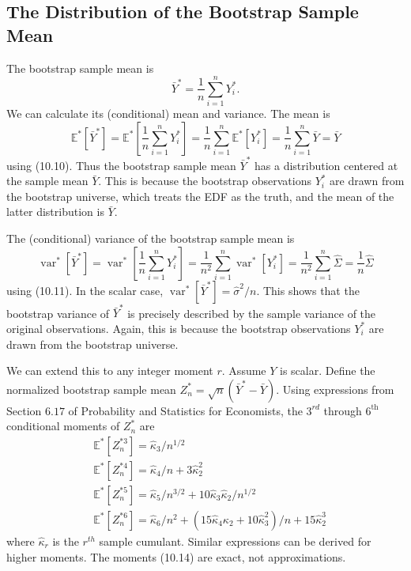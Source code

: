 \documentclass[10pt]{article}
\begin{document}
\subsection{The Distribution of the Bootstrap Sample Mean}
The bootstrap sample mean is
$$
\bar{Y}^{*}=\frac{1}{n} \sum_{i=1}^{n} Y_{i}^{*} .
$$
We can calculate its (conditional) mean and variance. The mean is
$$
\mathbb{E}^{*}\left[\bar{Y}^{*}\right]=\mathbb{E}^{*}\left[\frac{1}{n} \sum_{i=1}^{n} Y_{i}^{*}\right]=\frac{1}{n} \sum_{i=1}^{n} \mathbb{E}^{*}\left[Y_{i}^{*}\right]=\frac{1}{n} \sum_{i=1}^{n} \bar{Y}=\bar{Y}
$$
using (10.10). Thus the bootstrap sample mean $\bar{Y}^{*}$ has a distribution centered at the sample mean $\bar{Y}$. This is because the bootstrap observations $Y_{i}^{*}$ are drawn from the bootstrap universe, which treats the EDF as the truth, and the mean of the latter distribution is $\bar{Y}$.

The (conditional) variance of the bootstrap sample mean is
$$
\operatorname{var}^{*}\left[\bar{Y}^{*}\right]=\operatorname{var}^{*}\left[\frac{1}{n} \sum_{i=1}^{n} Y_{i}^{*}\right]=\frac{1}{n^{2}} \sum_{i=1}^{n} \operatorname{var}^{*}\left[Y_{i}^{*}\right]=\frac{1}{n^{2}} \sum_{i=1}^{n} \widehat{\Sigma}=\frac{1}{n} \widehat{\Sigma}
$$
using (10.11). In the scalar case, $\operatorname{var}^{*}\left[\bar{Y}^{*}\right]=\widehat{\sigma}^{2} / n$. This shows that the bootstrap variance of $\bar{Y}^{*}$ is precisely described by the sample variance of the original observations. Again, this is because the bootstrap observations $Y_{i}^{*}$ are drawn from the bootstrap universe.

We can extend this to any integer moment $r$. Assume $Y$ is scalar. Define the normalized bootstrap sample mean $Z_{n}^{*}=\sqrt{n}\left(\bar{Y}^{*}-\bar{Y}\right)$. Using expressions from Section $6.17$ of Probability and Statistics for Economists, the $3^{r d}$ through $6^{\text {th }}$ conditional moments of $Z_{n}^{*}$ are
$$
\begin{aligned}
&\mathbb{E}^{*}\left[Z_{n}^{* 3}\right]=\widehat{\kappa}_{3} / n^{1 / 2} \\
&\mathbb{E}^{*}\left[Z_{n}^{* 4}\right]=\widehat{\kappa}_{4} / n+3 \widehat{\kappa}_{2}^{2} \\
&\mathbb{E}^{*}\left[Z_{n}^{* 5}\right]=\widehat{\kappa}_{5} / n^{3 / 2}+10 \widehat{\kappa}_{3} \widehat{\kappa}_{2} / n^{1 / 2} \\
&\mathbb{E}^{*}\left[Z_{n}^{* 6}\right]=\widehat{\kappa}_{6} / n^{2}+\left(15 \widehat{\kappa}_{4} \kappa_{2}+10 \widehat{\kappa}_{3}^{2}\right) / n+15 \widehat{\kappa}_{2}^{3}
\end{aligned}
$$
where $\widehat{\kappa}_{r}$ is the $r^{t h}$ sample cumulant. Similar expressions can be derived for higher moments. The moments (10.14) are exact, not approximations.
\end{document}
